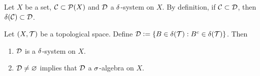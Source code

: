\documentclass{book}
\begin{document}
	\begin{note}
		Let $X$ be a set, $\mathcal{C} \subset \mathcal{P}(X)$ and $\mathcal{D}$ a $\delta$-system on $X$. By definition, if $\mathcal{C} \subset \mathcal{D}$, then $\delta(\mathcal{C}) \subset \mathcal{D}$.
	\end{note}

	\begin{ex} 
			Let $(X, \mathcal{T})$ be a topological space. Define $\mathcal{D} \vcentcolon= \{B \in \delta(\mathcal{T}): B^c \in \delta(\mathcal{T})\}$. Then 
			\begin{enumerate}
				\item $\mathcal{D}$ is a $\delta$-system on $X$.
				\item $\mathcal{D} \neq \varnothing$ implies that $\mathcal{D}$ a $\sigma$-algebra on $X$.
			\end{enumerate}
	\end{ex}
\end{document}
